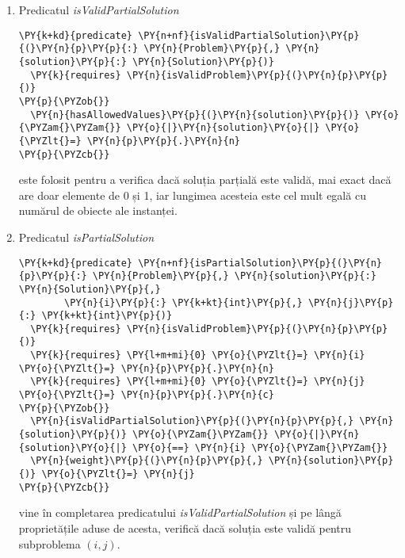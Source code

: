 \begin{enumerate}
\begin{Verbatim}[commandchars=\\\{\}]
\PY{p}{\PYZcb{}}
\end{Verbatim}
    este un predicat foarte important, folosit ca precondiție aproape pentru fiecare funcție și metodă din cod. Acest predicat este folosit ca validator pentru instanța problemei a cărei soluție optimă încercăm să găsim. Ne așteptăm astfel să avem cel puțin un obiect la dispoziție și un rucsac de capacitate mai mare decât zero, să știm greutatea și câștigul fiecărui obiect, iar acestea să fie la rândul lor valori pozitive diferite de zero.
    \item Predicatul \textit{isValidPartialSolution}
    \begin{Verbatim}[commandchars=\\\{\}]
\PY{k+kd}{predicate} \PY{n+nf}{isValidPartialSolution}\PY{p}{(}\PY{n}{p}\PY{p}{:} \PY{n}{Problem}\PY{p}{,} \PY{n}{solution}\PY{p}{:} \PY{n}{Solution}\PY{p}{)}
  \PY{k}{requires} \PY{n}{isValidProblem}\PY{p}{(}\PY{n}{p}\PY{p}{)}
\PY{p}{\PYZob{}}
  \PY{n}{hasAllowedValues}\PY{p}{(}\PY{n}{solution}\PY{p}{)} \PY{o}{\PYZam{}\PYZam{}} \PY{o}{|}\PY{n}{solution}\PY{o}{|} \PY{o}{\PYZlt{}=} \PY{n}{p}\PY{p}{.}\PY{n}{n}
\PY{p}{\PYZcb{}}
\end{Verbatim}
    este folosit pentru a verifica dacă soluția parțială este validă, mai exact dacă are doar elemente de 0 și 1, iar lungimea acesteia este cel mult egală cu numărul de obiecte ale instanței.
    \item Predicatul \textit{isPartialSolution}
    \begin{Verbatim}[commandchars=\\\{\}]
\PY{k+kd}{predicate} \PY{n+nf}{isPartialSolution}\PY{p}{(}\PY{n}{p}\PY{p}{:} \PY{n}{Problem}\PY{p}{,} \PY{n}{solution}\PY{p}{:} \PY{n}{Solution}\PY{p}{,} 
        \PY{n}{i}\PY{p}{:} \PY{k+kt}{int}\PY{p}{,} \PY{n}{j}\PY{p}{:} \PY{k+kt}{int}\PY{p}{)}
  \PY{k}{requires} \PY{n}{isValidProblem}\PY{p}{(}\PY{n}{p}\PY{p}{)}
  \PY{k}{requires} \PY{l+m+mi}{0} \PY{o}{\PYZlt{}=} \PY{n}{i} \PY{o}{\PYZlt{}=} \PY{n}{p}\PY{p}{.}\PY{n}{n}
  \PY{k}{requires} \PY{l+m+mi}{0} \PY{o}{\PYZlt{}=} \PY{n}{j} \PY{o}{\PYZlt{}=} \PY{n}{p}\PY{p}{.}\PY{n}{c}
\PY{p}{\PYZob{}}
  \PY{n}{isValidPartialSolution}\PY{p}{(}\PY{n}{p}\PY{p}{,} \PY{n}{solution}\PY{p}{)} \PY{o}{\PYZam{}\PYZam{}} \PY{o}{|}\PY{n}{solution}\PY{o}{|} \PY{o}{==} \PY{n}{i} \PY{o}{\PYZam{}\PYZam{}}
  \PY{n}{weight}\PY{p}{(}\PY{n}{p}\PY{p}{,} \PY{n}{solution}\PY{p}{)} \PY{o}{\PYZlt{}=} \PY{n}{j}
\PY{p}{\PYZcb{}}
\end{Verbatim}
    vine în completarea predicatului \textit{isValidPartialSolution} și pe lângă proprietățile aduse de acesta, verifică dacă soluția este validă pentru subproblema $(i, j)$.

\end{enumerate}
